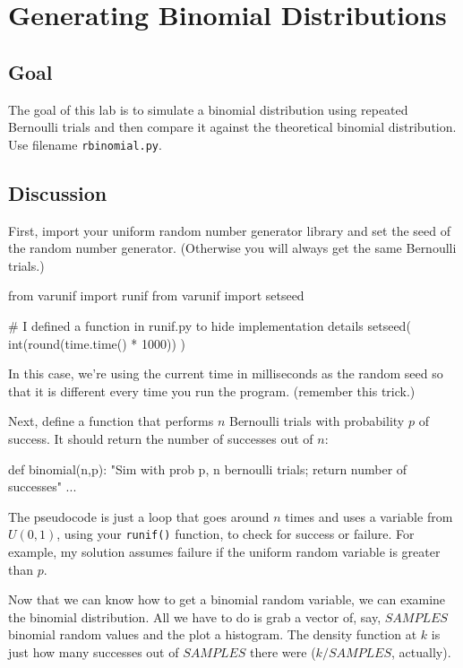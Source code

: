 \chapter{Generating Binomial Distributions}

\setcounter{problem}{1}
\section{Goal}

\begin{fullwidth}

The goal of this lab is to simulate a binomial distribution using repeated Bernoulli trials and then compare it against the theoretical binomial distribution. Use filename {\tt rbinomial.py}.

\section{Discussion}

\step First, import your uniform random number generator library and set the seed of the random number generator.
(Otherwise you will always get the same Bernoulli trials.) 

\begin{pyverbatim}
from varunif import runif
from varunif import setseed

# I defined a function in runif.py to hide implementation details
setseed( int(round(time.time() * 1000)) )
\end{pyverbatim}

In this case, we're using the current time in milliseconds as the random seed so that it is different every time you run the program. (remember this trick.)

\step Next, define a function that performs $n$ Bernoulli trials with probability $p$ of success. It should return the number of successes out of $n$:

\begin{pyverbatim}
def binomial(n,p):
    "Sim with prob p, n bernoulli trials; return number of successes"
    ...
\end{pyverbatim}

The pseudocode is just a loop that goes around $n$ times and uses a variable from $U(0,1)$, using your {\tt runif()} function, to check for success or failure. For example, my solution assumes failure if the uniform random variable is greater than $p$.
    
\step Now that we can know how to get a binomial random variable, we can examine the binomial distribution.  All we have to do is grab a vector of, say, $SAMPLES$ binomial random values and the plot a histogram.  The density function at $k$ is just how many successes out of $SAMPLES$ there were ($k/SAMPLES$, actually).


\end{fullwidth}
